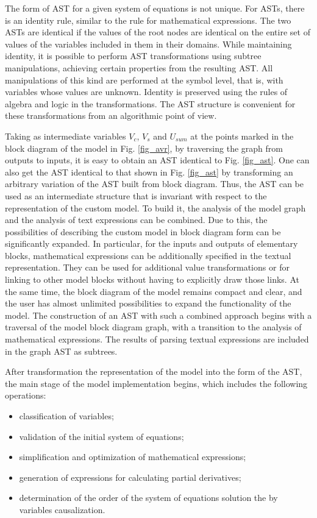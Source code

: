 \documentclass[lettersize,journal]{IEEEtran}
\begin{document}
The form of AST for a given system of equations is not unique. For ASTs, there is an identity rule, similar to the rule for
mathematical expressions. The two ASTs are identical if the values of the root nodes are identical on the entire set of values of the
variables included in them in their domains. While maintaining identity, it is possible to perform AST 
transformations using subtree manipulations, achieving certain properties from the resulting AST. All manipulations of 
this kind are performed at the symbol level, that is, with variables whose values are unknown. Identity is preserved 
using the rules of algebra and logic in the transformations. The AST structure is convenient for these 
transformations from an algorithmic point of view.

Taking as intermediate variables \(V_{c}\), \(V_{s}\) and \(U_{sum} \) at the points marked in the block diagram
of the model in Fig. \ref{fig_avr}, by traversing the graph from outputs to inputs, it is easy to obtain an AST 
identical to Fig. \ref{fig_ast}. One can also get the AST identical to that shown in Fig. \ref{fig_ast} by transforming 
an arbitrary variation of the AST built from block diagram. Thus, the AST can be used as an intermediate structure 
that is invariant with respect to the representation of the custom model. To build it, the analysis of the model 
graph and the analysis of text expressions can be combined. Due to this, the possibilities of describing 
the custom model in block diagram form can be significantly expanded. In particular, for the inputs and outputs 
of elementary blocks, mathematical expressions can be additionally specified in the textual representation. 
They can be used for additional value transformations or for linking to other model blocks without having to explicitly draw those links.
At the same time, the block diagram of the model remains compact and clear, and the user has almost unlimited 
possibilities to expand the functionality of the model. The construction of an AST with such a combined approach 
begins with a traversal of the model block diagram graph, with a transition to the analysis of mathematical expressions. The results 
of parsing textual expressions are included in the graph AST as subtrees.

After transformation the representation of the model into the form of the AST, the main stage of the model implementation begins, which includes the following operations:
\begin{itemize}
	\item classification of variables;
	\item validation of the initial system of equations;
	\item simplification and optimization of mathematical expressions;
	\item generation of expressions for calculating partial derivatives;
	\item determination of the order of the system of equations solution the by variables causalization.
\end{itemize}
\end{document}
